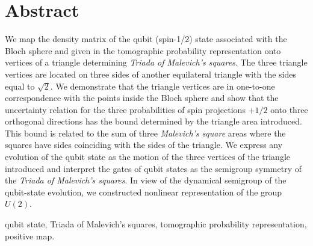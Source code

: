 \documentclass[12pt]{article}
\begin{document}








\section*{Abstract}
We map the density matrix of the qubit (spin-1/2) state associated
with the Bloch sphere and given in the tomographic probability
representation onto vertices of a triangle determining {\it Triada
of Malevich's squares}. The three triangle vertices are located on
three sides of another equilateral triangle with the sides equal to
$\sqrt 2$. We demonstrate that the triangle vertices are in
one-to-one correspondence with the points inside the Bloch sphere
and show that the uncertainty relation for the three probabilities
of spin projections $+1/2$ onto three orthogonal directions has the
bound determined by the triangle area introduced. This bound is
related to the sum of three {\it Malevich's square} areas where the
squares have sides coinciding with the sides of the triangle. We
express any evolution of the qubit state as the motion of the three
vertices of the triangle introduced and interpret the gates of qubit
states as the semigroup symmetry of the {\it Triada of Malevich's
squares}. In view of the dynamical semigroup of the qubit-state
evolution, we constructed nonlinear representation of the group
$U(2)$.

\medskip

 qubit state, Triada of Malevich's
squares, tomographic probability representation, positive map.
\end{document}

